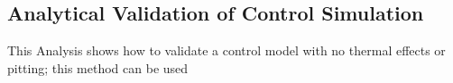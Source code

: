 \subsection{Analytical Validation of Control Simulation}
This Analysis shows how to validate a control model with no thermal effects or pitting; this method can be used